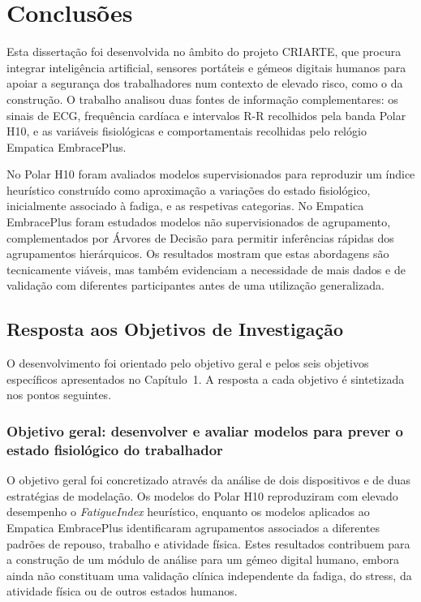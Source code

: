 
\chapter{Conclusões}
\label{chap:Conclusoes}

Esta dissertação foi desenvolvida no âmbito do projeto CRIARTE, que procura integrar inteligência artificial, sensores portáteis e gémeos digitais humanos para apoiar a segurança dos trabalhadores num contexto de elevado risco, como o da construção. O trabalho analisou duas fontes de informação complementares: os sinais de ECG, frequência cardíaca e intervalos R-R recolhidos pela banda Polar H10, e as variáveis fisiológicas e comportamentais recolhidas pelo relógio Empatica EmbracePlus.

No Polar H10 foram avaliados modelos supervisionados para reproduzir um índice heurístico construído como aproximação a variações do estado fisiológico, inicialmente associado à fadiga, e as respetivas categorias. No Empatica EmbracePlus foram estudados modelos não supervisionados de agrupamento, complementados por Árvores de Decisão para permitir inferências rápidas dos agrupamentos hierárquicos. Os resultados mostram que estas abordagens são tecnicamente viáveis, mas também evidenciam a necessidade de mais dados e de validação com diferentes participantes antes de uma utilização generalizada.

\section{Resposta aos Objetivos de Investigação}
\label{sec:resposta-objetivos}

O desenvolvimento foi orientado pelo objetivo geral e pelos seis objetivos específicos apresentados no Capítulo~1. A resposta a cada objetivo é sintetizada nos pontos seguintes.

\subsection*{Objetivo geral: desenvolver e avaliar modelos para prever o estado fisiológico do trabalhador}

O objetivo geral foi concretizado através da análise de dois dispositivos e de duas estratégias de modelação. Os modelos do Polar H10 reproduziram com elevado desempenho o \textit{FatigueIndex} heurístico, enquanto os modelos aplicados ao Empatica EmbracePlus identificaram agrupamentos associados a diferentes padrões de repouso, trabalho e atividade física. Estes resultados contribuem para a construção de um módulo de análise para um gémeo digital humano, embora ainda não constituam uma validação clínica independente da fadiga, do stress, da atividade física ou de outros estados humanos.

